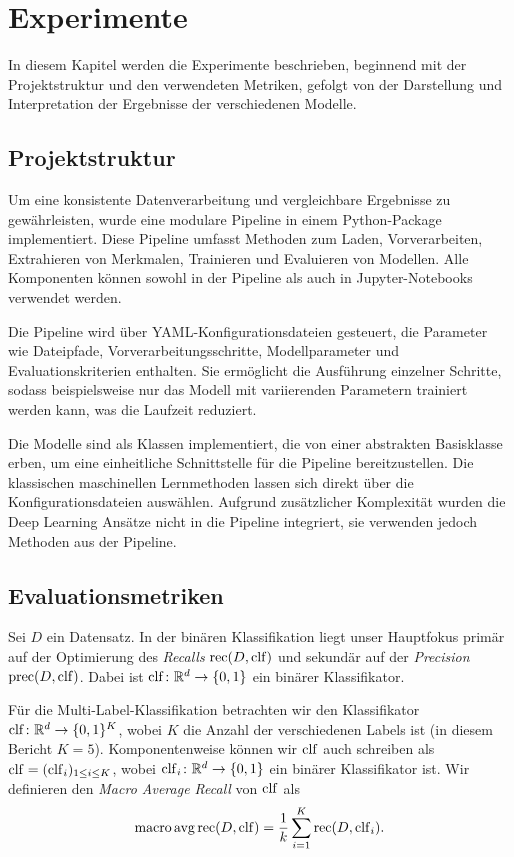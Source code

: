 \section{Experimente}
In diesem Kapitel werden die Experimente beschrieben, beginnend mit der Projektstruktur und den verwendeten Metriken, gefolgt von der Darstellung und Interpretation der Ergebnisse der verschiedenen Modelle.

\subsection{Projektstruktur}
\label{sec:projektstruktur}
Um eine konsistente Datenverarbeitung und vergleichbare Ergebnisse zu gewährleisten, wurde eine modulare Pipeline in einem Python-Package implementiert. Diese Pipeline umfasst Methoden zum Laden, Vorverarbeiten, Extrahieren von Merkmalen, Trainieren und Evaluieren von Modellen. Alle Komponenten können sowohl in der Pipeline als auch in Jupyter-Notebooks verwendet werden.

Die Pipeline wird über YAML-Konfigurationsdateien gesteuert, die Parameter wie Dateipfade, Vorverarbeitungsschritte, Modellparameter und Evaluationskriterien enthalten. Sie ermöglicht die Ausführung einzelner Schritte, sodass beispielsweise nur das Modell mit variierenden Parametern trainiert werden kann, was die Laufzeit reduziert.

Die Modelle sind als Klassen implementiert, die von einer abstrakten Basisklasse erben, um eine einheitliche Schnittstelle für die Pipeline bereitzustellen. Die klassischen maschinellen Lernmethoden lassen sich direkt über die Konfigurationsdateien auswählen. Aufgrund zusätzlicher Komplexität wurden die Deep Learning Ansätze nicht in die Pipeline integriert, sie verwenden jedoch Methoden aus der Pipeline.

\subsection{Evaluationsmetriken}
\label{sec:evaluationsmetriken}
Sei $D$ ein Datensatz. In der binären Klassifikation liegt unser Hauptfokus primär auf der Optimierung des \textit{Recalls} $\operatorname{rec}(D, \operatorname{clf})$ und sekundär auf der \textit{Precision} $\operatorname{prec}(D, \operatorname{clf})$. Dabei ist $\operatorname{clf}\colon\mathbb{R}^d\to \{0, 1\}$ ein binärer Klassifikator.

Für die Multi-Label-Klassifikation betrachten wir den Klassifikator $\operatorname{clf}\colon\mathbb{R}^d\to\{0, 1\}^K$, wobei $K$ die Anzahl der verschiedenen Labels ist (in diesem Bericht $K=5$). Komponentenweise können wir $\operatorname{clf}$ auch schreiben als $\operatorname{clf} = (\operatorname{clf}_i)_{1\leq i\leq K}$, wobei $\operatorname{clf}_i\colon\mathbb{R}^d\to\{0, 1\}$ ein binärer Klassifikator ist. Wir definieren den \textit{Macro Average Recall} von $\operatorname{clf}$ als
\begin{equation*}
    \operatorname{macro\,avg\,rec}(D, \operatorname{clf}) = \frac{1}{k}\sum_{i=1}^K\operatorname{rec} (D, \operatorname{clf}_i).
\end{equation*}

